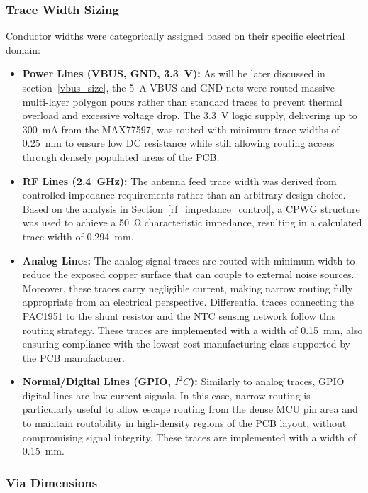 \subsubsection{Trace Width Sizing}
Conductor widths were categorically assigned based on their specific electrical domain:
\begin{itemize}
    \item \textbf{Power Lines (VBUS, GND, \SI{3.3}{\volt}):} As will be later discussed in section~\ref{vbus_size}, the \SI{5}{\ampere} VBUS and GND nets were routed massive multi-layer polygon pours rather than standard traces to prevent thermal overload and excessive voltage drop. The \SI{3.3}{\volt} logic supply, delivering up to \SI{300}{\milli\ampere} from the MAX77597, was routed with minimum trace widths of \SI{0.25}{\milli\meter} to ensure low DC resistance while still allowing routing access through densely populated areas of the PCB.
    \item \textbf{RF Lines (\SI{2.4}{\giga\hertz}):} The antenna feed trace width was derived from controlled impedance requirements rather than an arbitrary design choice. Based on the analysis in Section~\ref{rf_impedance_control}, a CPWG structure was used to achieve a \SI{50}{\ohm} characteristic impedance, resulting in a calculated trace width of \SI{0.294}{\milli\meter}.
    \item \textbf{Analog Lines:} The analog signal traces are routed with minimum width to reduce the exposed copper surface that can couple to external noise sources. Moreover, these traces carry negligible current, making narrow routing fully appropriate from an electrical perspective. Differential traces connecting the PAC1951 to the shunt resistor and the NTC sensing network follow this routing strategy. These traces are implemented with a width of \SI{0.15}{\milli\meter}, also ensuring compliance with the lowest-cost manufacturing class supported by the PCB manufacturer.
    \item \textbf{Normal/Digital Lines (GPIO, $I^2C$):} Similarly to analog traces, GPIO digital lines are low-current signals. In this case, narrow routing is particularly useful to allow escape routing from the dense MCU pin area and to maintain routability in high-density regions of the PCB layout, without compromising signal integrity. These traces are implemented with a width of \SI{0.15}{\milli\meter}.
\end{itemize}

\subsubsection{Via Dimensions}

